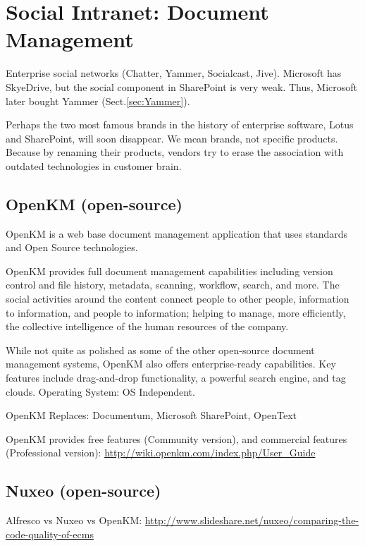 \chapter{Social Intranet: Document Management}

Enterprise social networks (Chatter, Yammer, Socialcast, Jive). Microsoft has
SkyeDrive, but the social component in SharePoint is very weak. Thus, Microsoft
later bought Yammer (Sect.\ref{sec:Yammer}).

Perhaps the two most famous brands in the history of enterprise software, Lotus
and SharePoint, will soon disappear. We mean brands, not specific products.
Because by renaming their products, vendors try to erase the association with
outdated technologies in customer brain. 

\section{OpenKM (open-source)}
\label{sec:OpenKM}

OpenKM is a web base document management application that uses standards and Open Source technologies.

OpenKM provides full document management capabilities including version control
and file history, metadata, scanning, workflow, search, and more.
The social activities around the content connect people to other people,
information to information, and people to information; helping to manage, more
efficiently, the collective intelligence of the human resources of the company.

While not quite as polished as some of the other open-source document management
systems, OpenKM also offers enterprise-ready capabilities. Key features include
drag-and-drop functionality, a powerful search engine, and tag clouds. Operating
System: OS Independent.

OpenKM Replaces: Documentum, Microsoft SharePoint, OpenText


OpenKM provides free features (Community version), and commercial features (Professional version):
\url{http://wiki.openkm.com/index.php/User_Guide}

\section{Nuxeo (open-source)}
\label{sec:Nuxeo}

Alfresco vs Nuxeo vs OpenKM:
\url{http://www.slideshare.net/nuxeo/comparing-the-code-quality-of-ecms}

